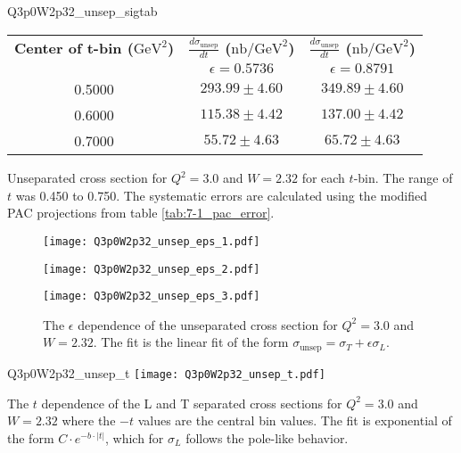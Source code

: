 \begin{Mtable}{Q3p0W2p32_unsep_sigtab}
  \centering
  \begin{tabular}{|c|c|c|}
    \hline
    \textbf{Center of t-bin ($\mathrm{GeV}^2$)} & \textbf{$\frac{d\sigma_{\mathrm{unsep}}}{dt}$ ($\mathrm{nb/GeV}^2$)} & \textbf{$\frac{d\sigma_{\mathrm{unsep}}}{dt}$ ($\mathrm{nb/GeV}^2$)} \\
    & $\epsilon=0.5736$ & $\epsilon=0.8791$ \\
    \hline
    0.5000 & $293.99\pm4.60$ & $349.89\pm4.60$\\
    0.6000 & $115.38\pm4.42$ & $137.00\pm4.42$\\
    0.7000 & $55.72\pm4.63$ & $65.72\pm4.63$\\
    \hline
  \end{tabular}
  \caption{Unseparated cross section for $Q^2=3.0$ and $W=2.32$ for each $t$-bin. The range of $t$ was 0.450 to 0.750. The systematic errors are calculated using the modified PAC projections from table \ref{tab:7-1_pac_error}.}
  \label{tab:Q3p0W2p32_unsep_sigtab}
\end{Mtable}

\begin{figure}
  \centering
  \begin{minipage}[b]{0.48\linewidth}
    \texttt{[image: Q3p0W2p32\_unsep\_eps\_1.pdf]}
  \end{minipage}
  \hfill
  \begin{minipage}[b]{0.48\linewidth}
    \texttt{[image: Q3p0W2p32\_unsep\_eps\_2.pdf]}
  \end{minipage}
  \begin{minipage}[b]{0.48\linewidth}
    \texttt{[image: Q3p0W2p32\_unsep\_eps\_3.pdf]}
  \end{minipage}
  \caption{The $\epsilon$ dependence of the unseparated cross section for $Q^2=3.0$ and $W=2.32$. The fit is the linear fit of the form $\sigma_{\mathrm{unsep}}=\sigma_T+\epsilon\sigma_L$.}
  \label{fig:Q3p0W2p32_unsep_eps}
\end{figure}

\begin{Mfigure}{Q3p0W2p32_unsep_t}
  \centering
  \texttt{[image: Q3p0W2p32\_unsep\_t.pdf]}
  \caption{The $t$ dependence of the L and T separated cross sections for $Q^2=3.0$ and $W=2.32$ where the $-t$ values are the central bin values. The fit is exponential of the form $C\cdot e^{-b\cdot|t|}$, which for $\sigma_L$ follows the pole-like behavior.}
  \label{fig:Q3p0W2p32_unsep_t}
\end{Mfigure}

